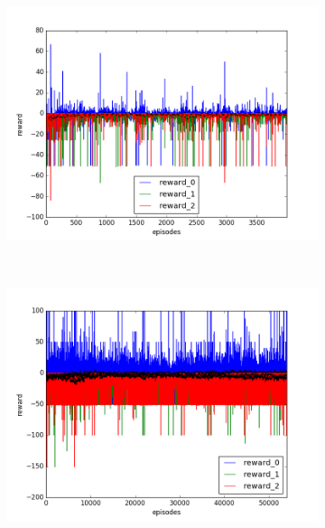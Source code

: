 \begin{figure}[t]
  \vspace{-0.5cm}
  \begin{subfigure}[t]{\figscale\linewidth}
    \hspace*{-2.75cm}
    \includegraphics[width=1.5\textwidth]
    {../results/dqn_2vs1/reward.png}
    \label{fig:dqn-2vs1-reward}
  \end{subfigure}
  ~
  \begin{subfigure}[t]{\figscale\linewidth}
    \hspace*{-1.4cm}
    \includegraphics[width=1.5\textwidth]
    {../results/ddpg_2vs1/reward.png}
    \label{fig:ddpg-2vs1-reward}
  \end{subfigure}
  ~
  \begin{subfigure}[t]{\figscale\linewidth}

\end{subfigure}
\end{figure}
